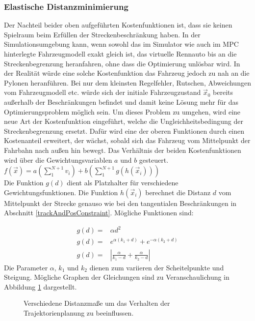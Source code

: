\documentclass{like}
\begin{document}
\subsubsection*{Elastische Distanzminimierung}
Der Nachteil beider oben aufgeführten Kostenfunktionen ist, dass sie keinen Spielraum beim Erfüllen der Streckenbeschränkung haben. In der Simulationsumgebung kann, wenn sowohl das im Simulator wie auch im \ac{MPC} hinterlegte Fahrzeugmodell exakt gleich ist, das virtuelle Rennauto bis an die Streckenbegrenzung heranfahren, ohne dass die Optimierung unlösbar wird. In der Realität würde eine solche Kostenfunktion das Fahrzeug jedoch zu nah an die Pylonen heranführen. Bei nur dem kleinsten Regelfehler, Rutschen, Abweichungen vom Fahrzeugmodell etc. würde sich der initiale Fahrzeugzustand $\vec{x}_0$ bereits außerhalb der Beschränkungen befindet und damit keine Lösung mehr für das Optimierungsproblem möglich sein. Um dieses Problem zu umgehen, wird eine neue Art der Kostenfunktion eingeführt, welche die Ungleichheitsbedingung der Streckenbegrenzung ersetzt. Dafür wird eine der oberen Funktionen durch einen Kostenanteil erweitert, der wächst, sobald sich das Fahrzeug vom Mittelpunkt der Fahrbahn nach außen hin bewegt. Das Verhältnis der beiden Kostenfunktionen wird über die Gewichtungsvariablen \(a\) und \(b\) gesteuert.\\
$f(\vec{x}) = a (\sum_{1}^{N+1} v_i) + b(\sum_{1}^{N+1} g(h(\vec{x}_i)))$  \\
Die Funktion $g(d)$ dient als Platzhalter für verschiedene Gewichtungsfunktionen. Die Funktion $h(\vec{x}_i)$ berechnet die Distanz \(d\) vom Mittelpunkt der Strecke genauso wie bei den tangentialen Beschränkungen in Abschnitt \ref{trackAndPosConstraint}. Mögliche Funktionen sind:

\begin{eqnarray}
	g(d) = &\alpha d^2 \\
	g(d) = &e^{\alpha (k_1 + d)} + e^{-\alpha(k_2 + d)} \label{eq:distMeasure1}\\
	g(d) = &|\frac{\alpha}{k_1-d} + \frac{\alpha}{k_2 - d}| \label{eq:distMeasure2}
\end{eqnarray}
Die Parameter $\alpha$, $k_1$ und $k_2$ dienen zum variieren der Scheitelpunkte und Steigung.
Mögliche Graphen der Gleichungen sind zu Veranschaulichung in Abbildung \ref{fig:elasticCost} dargestellt.

\begin{figure}[ht!]
	\centering
	 
	\caption{Verschiedene Distanzmaße um das Verhalten der Trajektorienplanung zu beeinflussen.}
	\label{fig:elasticCost}
\end{figure}
\end{document}
